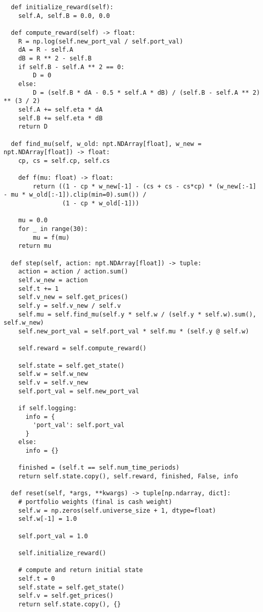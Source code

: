 \begin{verbatim}
  def initialize_reward(self):
    self.A, self.B = 0.0, 0.0

  def compute_reward(self) -> float:
    R = np.log(self.new_port_val / self.port_val)
    dA = R - self.A
    dB = R ** 2 - self.B
    if self.B - self.A ** 2 == 0:
        D = 0
    else:
        D = (self.B * dA - 0.5 * self.A * dB) / (self.B - self.A ** 2) ** (3 / 2)
    self.A += self.eta * dA
    self.B += self.eta * dB
    return D

  def find_mu(self, w_old: npt.NDArray[float], w_new = npt.NDArray[float]) -> float:
    cp, cs = self.cp, self.cs

    def f(mu: float) -> float:
        return ((1 - cp * w_new[-1] - (cs + cs - cs*cp) * (w_new[:-1] - mu * w_old[:-1]).clip(min=0).sum()) /
                (1 - cp * w_old[-1]))

    mu = 0.0
    for _ in range(30):
        mu = f(mu)
    return mu

  def step(self, action: npt.NDArray[float]) -> tuple:
    action = action / action.sum()
    self.w_new = action
    self.t += 1
    self.v_new = self.get_prices()
    self.y = self.v_new / self.v
    self.mu = self.find_mu(self.y * self.w / (self.y * self.w).sum(), self.w_new)
    self.new_port_val = self.port_val * self.mu * (self.y @ self.w)

    self.reward = self.compute_reward()

    self.state = self.get_state()
    self.w = self.w_new
    self.v = self.v_new
    self.port_val = self.new_port_val

    if self.logging:
      info = {
        'port_val': self.port_val
      }
    else:
      info = {}

    finished = (self.t == self.num_time_periods)
    return self.state.copy(), self.reward, finished, False, info

  def reset(self, *args, **kwargs) -> tuple[np.ndarray, dict]:
    # portfolio weights (final is cash weight)
    self.w = np.zeros(self.universe_size + 1, dtype=float)
    self.w[-1] = 1.0

    self.port_val = 1.0

    self.initialize_reward()

    # compute and return initial state
    self.t = 0
    self.state = self.get_state()
    self.v = self.get_prices()
    return self.state.copy(), {}
\end{verbatim}

